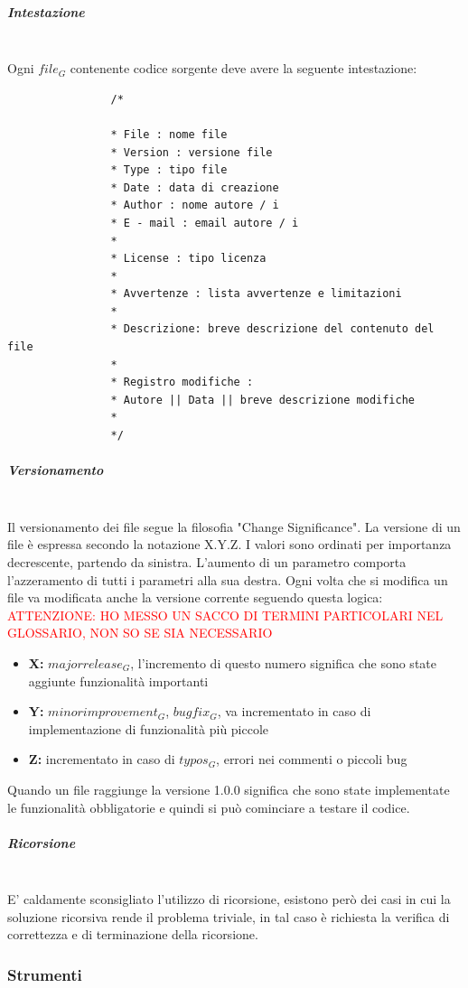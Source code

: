 			\subparagraph{Intestazione} \mbox{} \\
			Ogni $file_G$ contenente codice sorgente deve avere la seguente intestazione:
			\begin{lstlisting}
				/*
				
				* File : nome file
				* Version : versione file
				* Type : tipo file
				* Date : data di creazione
				* Author : nome autore / i
				* E - mail : email autore / i
				*
				* License : tipo licenza				
				*				
				* Avvertenze : lista avvertenze e limitazioni
				*
				* Descrizione: breve descrizione del contenuto del file
				*
				* Registro modifiche :
				* Autore || Data || breve descrizione modifiche
				*
				*/
			\end{lstlisting}
			\subparagraph{Versionamento} \mbox{} \\
			Il versionamento dei file segue la filosofia "Change Significance". La versione di un file è espressa secondo la notazione X.Y.Z. I valori sono ordinati per importanza decrescente, partendo da sinistra. L'aumento di un parametro comporta l'azzeramento di tutti i parametri alla sua destra. Ogni volta che si modifica un file va modificata anche la versione corrente seguendo questa logica:    
			\textcolor{red}{ATTENZIONE: HO MESSO UN SACCO DI TERMINI PARTICOLARI NEL GLOSSARIO, NON SO SE SIA NECESSARIO}  
			\begin{itemize}
				\item \textbf{X:} $major release_G$, l'incremento di questo numero significa che sono state aggiunte funzionalità importanti
				\item \textbf{Y:} $minor improvement_G$, $bugfix_G$, va incrementato in caso di implementazione di funzionalità più piccole
				\item \textbf{Z:} incrementato in caso di $typos_G$, errori nei commenti o piccoli bug
			\end{itemize}
			Quando un file raggiunge la versione 1.0.0 significa che sono state implementate le funzionalità obbligatorie e quindi si può cominciare a testare il codice.
			\subparagraph{Ricorsione} \mbox{} \\
			E' caldamente sconsigliato l'utilizzo di ricorsione, esistono però dei casi in cui la soluzione ricorsiva rende il problema triviale, in tal caso è richiesta la verifica di correttezza e di terminazione della ricorsione.
			
	\subsubsection{Strumenti}
